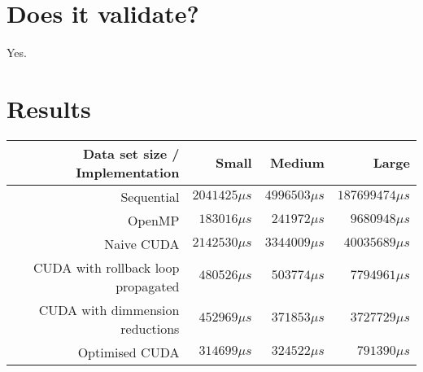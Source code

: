 \documentclass[]{report}
\begin{document}
\chapter{Does it validate?}
Yes.
\chapter{Results}
\begin{tabular}{|r|r|r|r|}
  \hline
  Data set size / Implementation & Small & Medium & Large\\
  \hline
  Sequential & $2041425 \mu s$ & $4996503 \mu s$ & $187699474 \mu s$ \\
 \hline
 OpenMP & $183016 \mu s$ & $241972 \mu s$ & $9680948 \mu s$\\
  \hline
 Naive CUDA & $2142530 \mu s$ & $3344009 \mu s$ & $40035689 \mu s$\\
  \hline
 CUDA with rollback loop propagated & $480526 \mu s$ & $503774 \mu s$ & $7794961 \mu s$\\
  \hline
 CUDA with dimmension reductions & $452969 \mu s$ & $371853 \mu s$ & $3727729 \mu s$\\
  \hline
 Optimised CUDA & $314699 \mu s$ & $324522 \mu s$ & $791390 \mu s$\\
  \hline
\end{tabular}
\end{document}
